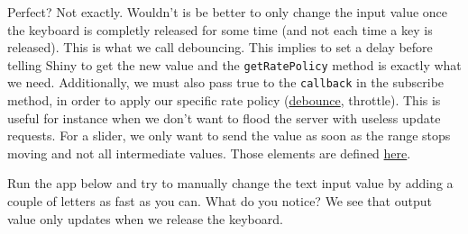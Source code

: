 \documentclass[]{book}
\begin{document}
Perfect? Not exactly. Wouldn't is be better to only change the input value once the keyboard is completly released for some time (and not each time a key is released). This is what we call debouncing. This implies to set a delay before telling Shiny to get the new value and the \texttt{getRatePolicy} method is exactly what we need. Additionally, we must also pass true to the \texttt{callback} in the subscribe method, in order to apply our specific rate policy (\href{https://davidwalsh.name/javascript-debounce-function}{debounce}, throttle). This is useful for instance when we don't want to flood the server with useless update requests. For a slider, we only want to send the value as soon as the range stops moving and not all intermediate values. Those elements are defined \href{https://github.com/rstudio/shiny/blob/master/srcjs/input_rate.js}{here}.

Run the app below and try to manually change the text input value by adding a couple of letters as fast as you can. What do you notice? We see that output value only updates when we release the keyboard.
\end{document}
